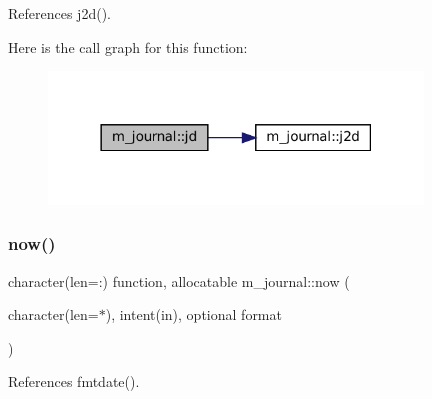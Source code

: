 References j2d().

Here is the call graph for this function\+:\nopagebreak
\begin{figure}[H]
\begin{center}
\leavevmode
\includegraphics[width=282pt]{namespacem__journal_a1e8e57f466830af519edad2004176fbc_cgraph}
\end{center}
\end{figure}
\mbox{\label{namespacem__journal_a4a421ecf44cfb86feeee17c7505d7b98}} 
\subsubsection{\texorpdfstring{now()}{now()}}
{\footnotesize\ttfamily character(len=\+:) function, allocatable m\+\_\+journal\+::now (\begin{DoxyParamCaption}\item[{character(len=$\ast$), intent(in), optional}]{format }\end{DoxyParamCaption})\hspace{0.3cm}{\ttfamily [private]}}



References fmtdate().

